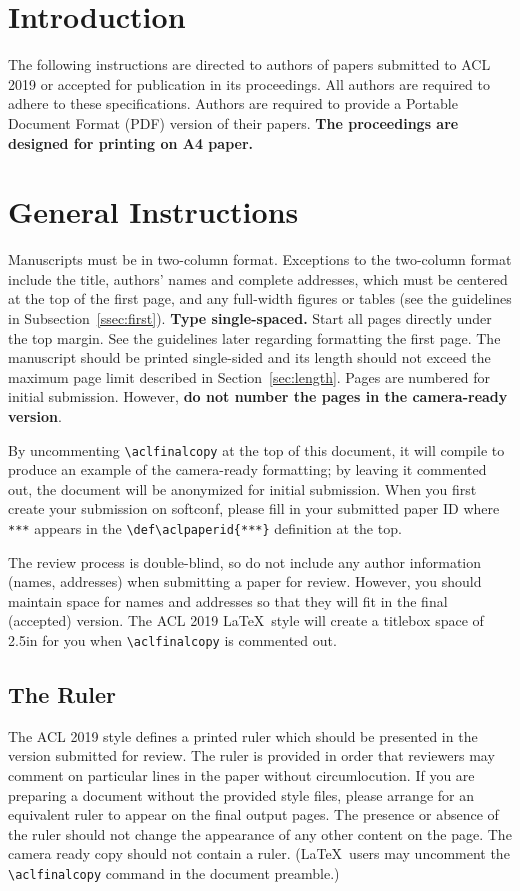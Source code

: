 \documentclass[11pt,a4paper]{article}
\begin{document}
\section{Introduction}

The following instructions are directed to authors of papers submitted
to ACL 2019 or accepted for publication in its proceedings. All
authors are required to adhere to these specifications. Authors are
required to provide a Portable Document Format (PDF) version of their
papers. \textbf{The proceedings are designed for printing on A4
paper.}

\section{General Instructions}

Manuscripts must be in two-column format.  Exceptions to the
two-column format include the title, authors' names and complete
addresses, which must be centered at the top of the first page, and
any full-width figures or tables (see the guidelines in
Subsection~\ref{ssec:first}). \textbf{Type single-spaced.}  Start all
pages directly under the top margin. See the guidelines later
regarding formatting the first page.  The manuscript should be
printed single-sided and its length
should not exceed the maximum page limit described in Section~\ref{sec:length}.
Pages are numbered for  initial submission. However, \textbf{do not number the pages in the camera-ready version}.

By uncommenting {\small\verb|\aclfinalcopy|} at the top of this 
 document, it will compile to produce an example of the camera-ready formatting; by leaving it commented out, the document will be anonymized for initial submission.  When you first create your submission on softconf, please fill in your submitted paper ID where {\small\verb|***|} appears in the {\small\verb|\def\aclpaperid{***}|} definition at the top.

The review process is double-blind, so do not include any author information (names, addresses) when submitting a paper for review.  
However, you should maintain space for names and addresses so that they will fit in the final (accepted) version.  The ACL 2019 \LaTeX\ style will create a titlebox space of 2.5in for you when {\small\verb|\aclfinalcopy|} is commented out.  

\subsection{The Ruler}
The ACL 2019 style defines a printed ruler which should be presented in the
version submitted for review.  The ruler is provided in order that
reviewers may comment on particular lines in the paper without
circumlocution.  If you are preparing a document without the provided
style files, please arrange for an equivalent ruler to
appear on the final output pages.  The presence or absence of the ruler
should not change the appearance of any other content on the page.  The
camera ready copy should not contain a ruler. (\LaTeX\ users may uncomment the {\small\verb|\aclfinalcopy|} command in the document preamble.)  
\end{document}

